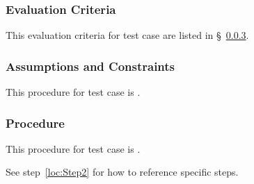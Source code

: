 \subsubsection{Evaluation Criteria}
\label{loc:TestCaseEvaluationCriteria\StsTestSpecID\StsTestCaseID}


This evaluation criteria for test \StsTestSpecID{} case \StsTestCaseID{} are listed in \S~\ref{loc:TestCaseProcedure\StsTestSpecID\StsTestCaseID}.

\subsubsection{Assumptions and Constraints}
\label{loc:TestCaseAssumptions\StsTestSpecID\StsTestCaseID}


This procedure for test \StsTestSpecID{} case \StsTestCaseID{} is \TBD.

\subsubsection{Procedure}
\label{loc:TestCaseProcedure\StsTestSpecID\StsTestCaseID}


This procedure for test \StsTestSpecID{} case \StsTestCaseID{} is \TBD.

See step~\ref{loc:Step2} for how to reference specific steps.

